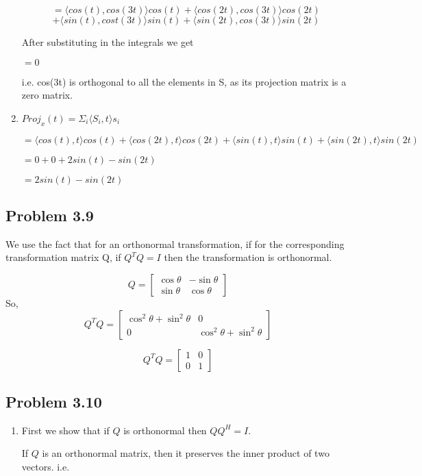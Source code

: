 \documentclass[letterpaper,12pt]{article}
\theoremstyle{definition}
\begin{document}
\begin{spacing}{1.3}{}
\begin{enumerate}
	$$= \langle cos(t), cos(3t) \rangle cos(t) + \langle cos(2t), cos(3t) \rangle cos(2t)$$
	$$+ \langle sin(t), cost(3t) \rangle sin(t) + \langle sin(2t), cos(3t) \rangle sin(2t)$$

	After substituting in the integrals we get

	$=0$

	i.e. cos(3t) is orthogonal to all the elements in S, as its projection matrix is a zero matrix.
	\item
		$Proj_{x}(t) = \Sigma_{i}\langle S_i , t \rangle s_i$

	$= \langle cos(t), t \rangle cos(t) + \langle cos(2t), t \rangle cos(2t) + \langle sin(t), t \rangle sin(t) + \langle sin(2t), t \rangle sin(2t)$

	$= 0 + 0 + 2sin(t) - sin(2t)$

	$=2sin(t) - sin(2t)$

\end{enumerate}

\subsection*{Problem 3.9}

	We use the fact that for an orthonormal transformation, if for the corresponding transformation matrix Q, if  $Q^TQ = I$ then the transformation is orthonormal.

	\[Q=
	\begin{bmatrix}
	\cos \theta & -\sin \theta \\
	\sin \theta & \cos \theta
	\end{bmatrix}
	\]
	So,
	\[Q^{T}Q=
	\begin{bmatrix}
	\cos^{2} \theta + \sin^{2} \theta & 0 \\
	0 & \cos^{2} \theta + \sin^{2} \theta
	\end{bmatrix}
	\]

	\[Q^{T}Q=
	\begin{bmatrix}
	1 & 0 \\
	0 & 1
	\end{bmatrix}
	\]

\subsection*{Problem 3.10}
\begin{enumerate}
  \item
  First we show that if $Q$ is orthonormal then $QQ^H = I$.

	If $Q$ is an orthonormal matrix, then it preserves the inner product of two vectors. i.e.


\end{enumerate}
\end{spacing}
\end{document}
